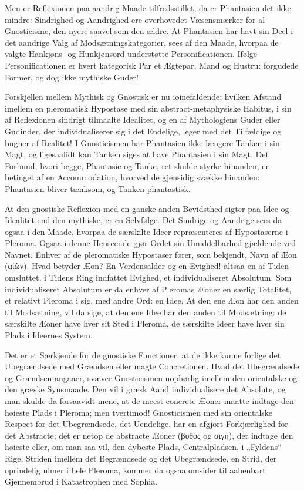 \documentclass[12pt]{book}
\newcommand{\opage}[1]{\marginnote{\footnotesize\textit{[#1]}}}
\begin{document}
Men er Reflexionen paa aandrig Maade tilfredsstillet, da
er Phantasien det ikke mindre: Sindrighed og Aandrighed ere
overhovedet Væsensmærker for al Gnosticisme, den nyere saavel
som den ældre. At Phantasien har havt sin Deel i det
aandrige Valg af Modsætningskategorier, sees af den Maade,
hvorpaa de valgte Hankjøns- og Hunkjønsord understøtte
Personificationen. Ifølge Personificationen er hvert kategorisk
Par et Ægtepar, Mand og Hustru: forgudede Former, og
dog ikke mythiske Guder!

Forskjellen mellem Mythisk og Gnostisk er nu iøinefaldende;
\opage{84}hvilken Afstand imellem en pleromatisk Hypostase med sin
abstract-metaphysiske Habitus, i sin af Reflexionen sindrigt tilmaalte
Idealitet, og en af Mythologiens Guder eller Gudinder,
der individualiserer sig i det Endelige, leger med det Tilfældige
og bugner af Realitet! I Gnosticismen har Phantasien
ikke længere Tanken i sin Magt, og ligesaalidt kan Tanken
siges at have Phantasien i sin Magt. Det Forbund, hvori
begge, Phantasie og Tanke, ret skulde styrke hinanden, er betinget
af en Accommodation, hvorved de gjensidig svække hinanden:
Phantasien bliver tænksom, og Tanken phantastisk.

At den gnostiske Reflexion med en ganske anden Bevidsthed
sigter paa Idee og Idealitet end den mythiske, er en Selvfølge.
Det Sindrige og Aandrige sees da ogsaa i den Maade,
hvorpaa de særskilte Ideer repræsenteres af Hypostaserne i
Pleroma. Ogsaa i denne Henseende gjør Ordet sin Umiddelbarhed
gjældende ved Navnet. Enhver af de pleromatiske Hypostaser
fører, som bekjendt, Navn af Æon (αἰὼν). Hvad
betyder Æon? En Verdensalder og en Evighed! altsaa en
af Tiden omsluttet, i Tidens Ring indfattet Evighed, et individualiseret
Absolutum. Som individualiseret Absolutum er
da enhver af Pleromas Æoner en særlig Totalitet, et relativt
Pleroma i sig, med andre Ord: en Idee. At den ene Æon
har den anden til Modsætning, vil da sige, at den ene Idee
har den anden til Modsætning: de særskilte Æoner have hver
sit Sted i Pleroma, de særskilte Ideer have hver sin Plads i
Ideernes System.

Det er et Særkjende for de gnostiske Functioner, at de
ikke kunne forlige det Ubegrændsede med Grændsen eller magte
Concretionen. Hvad det Ubegrændsede og Grændsen angaaer,
svæver Gnosticismen uophørlig imellem den orientalske og den
græske Synsmaade. Den vil i græsk Aand individualisere
det Absolute, og man skulde da forsaavidt mene, at de meest
concrete Æoner maatte indtage den høieste Plads i Pleroma;
men tvertimod! Gnosticismen med sin orientalske Respect for
\opage{85}det Ubegrændsede, det Uendelige, har en afgjort Forkjærlighed
for det Abstracte; det er netop de abstracte Æoner (βυθὸς
og σιγὴ), der indtage den høieste eller, om man saa vil, den
dybeste Plads, Centralpladsen, i „Fyldens“ Rige. Striden
imellem det Begrændsede og det Ubegrændsede, en Strid, der
oprindelig ulmer i hele Pleroma, kommer da ogsaa omsider
til aabenbart Gjennembrud i Katastrophen med Sophia.
\end{document}
